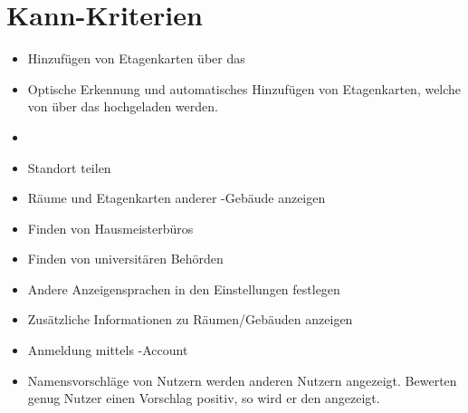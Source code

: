 \section{Kann-Kriterien}

\begin{itemize}

    \item Hinzufügen von Etagenkarten über das 
    \item Optische Erkennung und automatisches Hinzufügen von Etagenkarten,
     welche von %
     über das %
      hochgeladen werden.
    \item   
    \item Standort teilen 
    \item Räume und Etagenkarten anderer %
    -Gebäude anzeigen
    \item Finden von Hausmeisterbüros
    \item Finden von universitären Behörden
    \item Andere Anzeigensprachen in den Einstellungen festlegen
    \item Zusätzliche Informationen zu Räumen/Gebäuden anzeigen
    \item Anmeldung mittels %
    -Account
    \item Namensvorschläge von Nutzern werden anderen Nutzern angezeigt. Bewerten genug Nutzer einen 
    Vorschlag positiv, so wird er den %
     angezeigt.
    
        

\end{itemize}